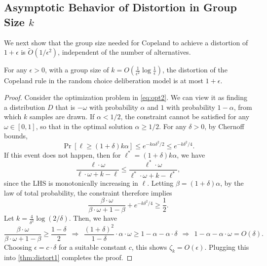 \subsection{Asymptotic Behavior of Distortion in Group Size $k$}
We next show that the group size needed for Copeland to achieve a distortion of $1+\epsilon$ is $\tilde{O}(1/\epsilon^2)$, independent of the number of alternatives.

\begin{theorem}
\label{thm:asymp1}
For any $\epsilon > 0$, with a group size of $k = O\left(\frac{1}{\epsilon^2} \log\frac{1}{\epsilon}\right)$, the distortion of the Copeland rule in the random choice deliberation model is at most $1+\epsilon$.
\end{theorem}
\begin{proof}
  Consider the optimization problem in \cref{eq:opt2}. We can view it as finding a distribution $D$ that is $-\omega$ with probability $\alpha$ and $1$ with probability $1-\alpha$, from which $k$ samples are drawn. If $\alpha < 1/2$, the constraint cannot be satisfied for any $\omega \in [0,1]$, so that in the optimal solution $\alpha \ge 1/2$. For any $\delta > 0$, by Chernoff bounds, 
  $$ \Pr[ \ell \ge (1+\delta) k \alpha] \le e^{-k \alpha \delta^2/2} \le e^{-k  \delta^2/4}. $$
  If this event does not happen, then for $\ell^* = (1+\delta) k \alpha$, we have
  $$ \frac{\ell \cdot \omega}{\ell \cdot \omega + k-\ell } \le \frac{\ell^* \cdot \omega}{\ell^* \cdot \omega + k-\ell^* }, $$
 since the LHS is monotonically increasing in $\ell$. Letting $\beta = (1+\delta) \alpha$, by the law of total probability, the constraint therefore implies
  $$ \frac{\beta \cdot \omega}{\beta \cdot \omega + 1-\beta } + e^{-k \delta^2/4} \ge \frac{1}{2}. $$
  Let $k = \frac{4}{\delta^2} \log (2/\delta) $. Then, we have
  $$ \frac{\beta \cdot \omega}{\beta \cdot \omega + 1-\beta } \ge \frac{1 - \delta}{2} \ \  \Rightarrow \ \  \frac{(1+\delta)^2}{1-\delta} \cdot \alpha \cdot \omega \ge 1 - \alpha - \alpha \cdot \delta \ \ \Rightarrow \ \  1 - \alpha - \alpha \cdot \omega = O(\delta). $$
  Choosing $\epsilon = c \cdot \delta$ for a suitable constant $c$, this shows $\zeta_k = O(\epsilon)$. Plugging this into \cref{thm:distort1} completes the proof.
\end{proof}

